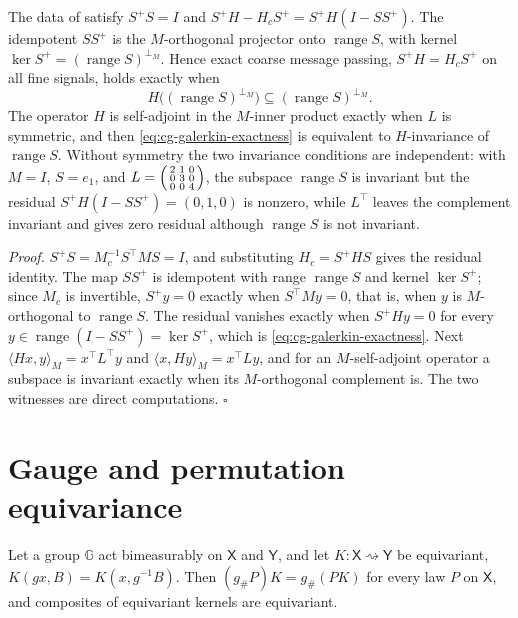 \label{eq:cg-message-residual}
The data of  satisfy $S^+S=I$ and $S^+H-H_cS^+=S^+H(I-SS^+)$. The
idempotent $SS^+$ is the $M$-orthogonal projector onto $\operatorname{range}S$, with kernel
$\ker S^+=(\operatorname{range}S)^{\perp_M}$. Hence exact coarse message passing, $S^+H=H_cS^+$ on
all fine signals, holds exactly when
\begin{equation}
H\bigl((\operatorname{range}S)^{\perp_M}\bigr)\subseteq(\operatorname{range}S)^{\perp_M}.
\label{eq:cg-galerkin-exactness}
\end{equation}
The operator $H$ is self-adjoint in the $M$-inner product exactly when $L$ is symmetric, and then
\eqref{eq:cg-galerkin-exactness} is equivalent to $H$-invariance of $\operatorname{range}S$.
Without symmetry the two invariance conditions are independent: with $M=I$, $S=e_1$, and
$L=\begin{psmallmatrix}2&1&0\\0&3&0\\0&0&4\end{psmallmatrix}$, the subspace $\operatorname{range}S$
is invariant but the residual $S^+H(I-SS^+)=(0,1,0)$ is nonzero, while $L^\top$ leaves the
complement invariant and gives zero residual although $\operatorname{range}S$ is not invariant.

\noindent\emph{Proof.}
$S^+S=M_c^{-1}S^\top MS=I$, and substituting $H_c=S^+HS$ gives the residual identity. The map
$SS^+$ is idempotent with range $\operatorname{range}S$ and kernel $\ker S^+$; since $M_c$ is
invertible, $S^+y=0$ exactly when $S^\top My=0$, that is, when $y$ is $M$-orthogonal to
$\operatorname{range}S$. The residual vanishes exactly when $S^+Hy=0$ for every
$y\in\operatorname{range}(I-SS^+)=\ker S^+$, which is \eqref{eq:cg-galerkin-exactness}. Next
$\langle Hx,y\rangle_M=x^\top L^\top y$ and $\langle x,Hy\rangle_M=x^\top Ly$, and for an
$M$-self-adjoint operator a subspace is invariant exactly when its $M$-orthogonal complement is.
The two witnesses are direct computations. $\square$

\section{Gauge and permutation equivariance}
\label{sec:cg-equivariance}

\label{eq:cg-law-equivariance}
\label{eq:cg-kernel-equivariance}
Let a group $\mathbb G$ act bimeasurably on $\mathsf X$ and $\mathsf Y$, and let
$K:\mathsf X\rightsquigarrow\mathsf Y$ be equivariant, $K(gx,B)=K(x,g^{-1}B)$. Then
$(g_\#P)K=g_\#(PK)$ for every law $P$ on $\mathsf X$, and composites of equivariant kernels are
equivariant. 


